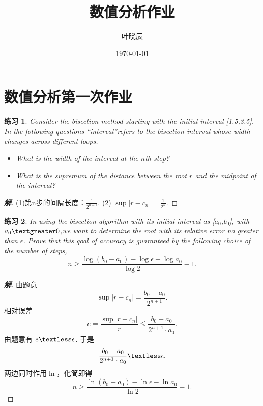 \documentclass[lang=cn,bibend=bibtex]{elegantpaper}
\title{数值分析作业}
\author{叶晓辰}
\date{\today}
\theoremstyle{boldexercise}
\newtheorem{exercise}{练习}[section]
\newenvironment{solution}{\begin{proof}[\textbf{\emph 解}]}{\end{proof}}
\begin{document}
\maketitle

\section{数值分析第一次作业}
\begin{exercise}
  Consider the bisection method starting with the initial interval [1.5,3.5]. In the following questions ``interval''refers to the bisection interval whose width changes across different loops.
\begin{itemize}
  \item What is the width of the interval at the $n$th step?
  \item What is the supremum of the distance between the root $r$ and the midpoint of the interval? 
\end{itemize}
\end{exercise}
\begin{solution}
  (1)第n步的间隔长度：$\frac{1}{2^{n-1}}$.
  (2) $\sup\vert r-c_{n}\vert=\frac{1}{2^{n}}$.
\end{solution}
\begin{exercise}
  In using the bisection algorithm with its initial interval as [$a_0$,b$_0$], with $a_0 \textgreater 0$,we want to determine the root with its relative error no greater than $\epsilon$. Prove that this goal of accuracy is guaranteed by the following choice of the number of steps,
  \begin{equation*}
    n \ge \frac{\log(b_0-a_0)-\log\epsilon-\log a_0}{\log 2}-1.
  \end{equation*}
\end{exercise}
\begin{solution}
  由题意
  \begin{equation}
    \label{eq:1.2.1}
    \sup\vert r-c_{n}\vert= \frac{b_{0}-a_{0}}{2^{n+1}}.
  \end{equation}
  相对误差
  \begin{equation}
    \label{eq:1.2.2}
    e=\frac{\sup \vert r-c_{n} \vert}{r}\le \frac{b_{0}-a_{0}}{2^{n+1}\cdot a_{0}}.
  \end{equation}
  由题意有
    $e \textless \epsilon$.
  于是
  \begin{equation}
    \label{eq:1.2.3}
     \frac{b_{0}-a_{0}}{2^{n+1}\cdot a_{0} }\textless \epsilon .
  \end{equation}
  两边同时作用$\ln$，化简即得
  \begin{equation}
    \label{eq:1.2.4}
     n \ge \frac{\ln(b_{0}-a_{0})-\ln\epsilon-\ln a_{0}}{\ln2}-1. 
  \end{equation}
\end{solution}
\end{document}
